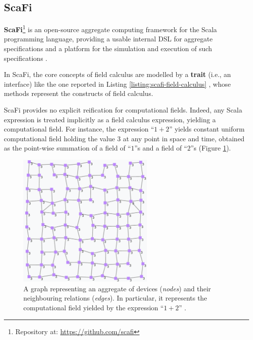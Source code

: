 
\subsection{ScaFi}
\label{section:background:technologies:scafi}

\textbf{\ac{ScaFi}}\footnote{Repository at: \url{https://github.com/scafi}} is an
open-source aggregate computing framework for the Scala programming language,
providing a usable internal \ac{DSL} for aggregate specifications and a
platform for the simulation and execution of such specifications
\cite{ScaFi-Documentation}.

In \ac{ScaFi}, the core concepts of field calculus are modelled by a
\textbf{trait} (i.e., an interface) like the one reported in Listing
\ref{listing:scafi-field-calculus} \cite{FieldCalculus-AggregateComputing},
whose methods represent the constructs of field calculus.



\ac{ScaFi} provides no explicit reification for computational fields. Indeed,
any Scala expression is treated implicitly as a field calculus expression,
yielding a computational field. For instance, the expression \enquote{$1+2$}
yields constant uniform computational field holding the value $3$ at any point
in space and time, obtained as the point-wise summation of a field of
\enquote{$1$}s and a field of \enquote{$2$}s (Figure
\ref{figure:constant-uniform-field}).

\begin{figure}[h]
  \centering
  \includegraphics[width=0.60\textwidth]{resources/figures/constant-uniform-field.png}
  \caption{
    A graph representing an aggregate of devices (\textit{nodes}) and their
    neighbouring relations (\textit{edges}). In particular, it represents the
    computational field yielded by the expression \enquote{$1+2$}
    \cite{ScaFi-Documentation}.
  }
  \label{figure:constant-uniform-field}
\end{figure}

